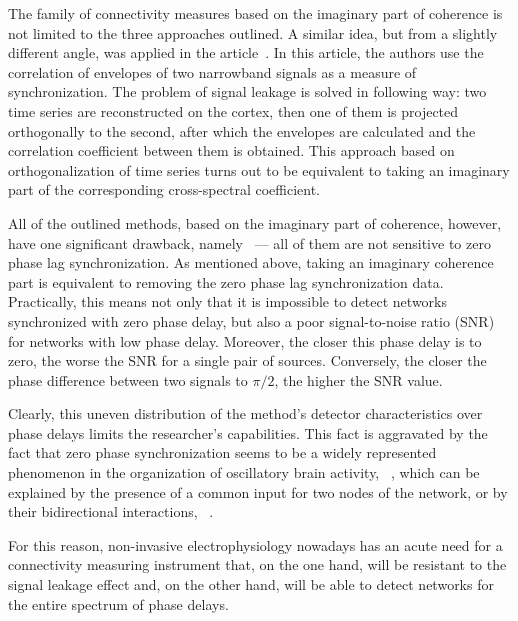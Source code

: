 The family of connectivity measures based on the imaginary part of coherence is
not limited to the three approaches outlined. A similar idea, but from a
slightly different angle, was applied in the article~\cite{Hipp2012}. In this
article, the authors use the correlation of envelopes of two narrowband signals
as a measure of synchronization. The problem of signal leakage is solved in
following way: two time series are reconstructed on the cortex, then one of
them is projected orthogonally to the second, after which the envelopes are
calculated and the correlation coefficient between them is obtained.  This
approach based on orthogonalization of time series turns out to be equivalent
to taking an imaginary part of the corresponding cross-spectral coefficient.



All of the outlined methods, based on the imaginary part of coherence, however,
have one significant drawback, namely ~--- all of them are not sensitive to
zero phase lag synchronization. As mentioned above, taking an imaginary
coherence part is equivalent to removing the zero phase lag synchronization
data. Practically, this means not only that it is impossible to detect networks
synchronized with zero phase delay, but also a poor signal-to-noise ratio (SNR)
for networks with low phase delay. Moreover, the closer this phase delay is to
zero, the worse the SNR for a single pair of sources.  Conversely, the closer
the phase difference between two signals to $\pi / 2$, the higher the SNR
value.

Clearly, this uneven distribution of the method's detector characteristics over
phase delays limits the researcher's capabilities.  This fact is aggravated by
the fact that zero phase synchronization seems to be a widely represented
phenomenon in the organization of oscillatory brain activity, ~\cite{roelfsema,
Singer1999, Engel2001}, which can be explained by the presence of a common
input for two nodes of the network, or by their bidirectional interactions,
~\cite{rajagovindan}.

For this reason, non-invasive electrophysiology nowadays has an acute need for
a connectivity measuring instrument that, on the one hand, will be resistant to
the signal leakage effect and, on the other hand, will be able to detect
networks for the entire spectrum of phase delays.


